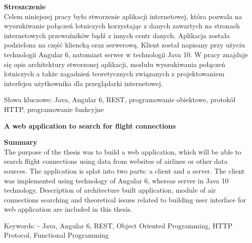 \documentclass[12pt, twoside]{report}
\newcommand\tab[1][0.5cm]{\hspace*{#1}}
\newcommand\blankpage{%
	\null
    \thispagestyle{empty}%
    \newpage}
\begin{document}
\begin{flushleft}
	{\fontsize{14pt}{12pt}\selectfont
		\textbf{Streszczenie}}\\
	\vspace{1cm}
\tab Celem niniejszej pracy było stworzenie aplikacji internetowej, która pozwala na wyszukiwanie połączeń lotniczych korzystając z danych zawartych na stronach internetowych przewoźników bądź z innych centr danych. Aplikacja została podzielona na część kliencką oraz serwerową. Klient został napisany przy użyciu technologii Angular 6, natomiast serwer w technologii Java 10. W pracy znajduje się opis architektury stworzonej aplikacji, modułu wyszukiwania połączeń lotniczych a także zagadnień teoretycznych związanych z projektowaniem interfejsu użytkownika dla przeglądarki internetowej.
\end{flushleft}
\vspace{0.5cm}
Słowa kluczowe: Java, Angular 6, REST, programowanie obiektowe, protokół HTTP, programowanie funkcyjne

\vspace{1.5cm}

\begin{center}
	{\fontsize{14pt}{12pt}\selectfont
		\textbf{A web application to search for flight connections}}
\end{center}

\begin{flushleft}
	{\fontsize{14pt}{12pt}\selectfont
		\textbf{Summary}}\\
	\vspace{1cm}
\tab The purpose of the thesis was to build a web application, which will be able to search flight connections using data from websites of airlines or other data sources. The application is splat into two parts: a client and a server. The client was implemented using technology of Angular 6, whereas server in Java 10 technology. Description of architecture built application, module of air connections searching and theoretical issues related to building user interface for web application are included in this thesis. 
\end{flushleft}
\vspace{0.5cm}
Keywords: - Java, Angular 6, REST, Object Oriented Programming, HTTP Protocol, Functional Programming
\afterpage{\blankpage}


\renewcommand{\contentsname}{Spis treści}
\newpage
{}
\setcounter{page}{9}
\tableofcontents

\newpage
\end{document}
